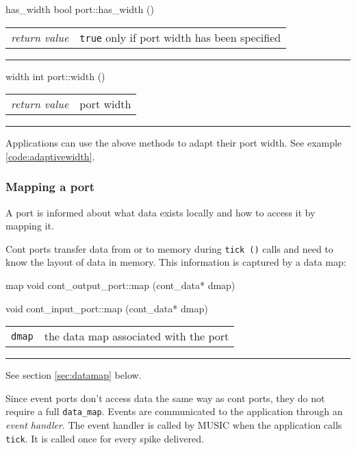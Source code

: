 \documentclass[a4paper]{report}
\makeatletter
\newenvironment{parameters}%
{\begin{tabular}{@{\hspace{2em}}lp{0.6\textwidth}}}%
{\end{tabular}\par\vspace{1mm}\par\hrule\par\vspace{5mm}}
\makeatother
\begin{document}
\begin{head}{has_width}
  bool port::has_width ()
\end{head}
\begin{parameters}
  \emph{return value} & \lstinline|true| only if port width has been
                         specified \\
\end{parameters}

\begin{head}{width}
  int port::width ()
\end{head}
\begin{parameters}
  \emph{return value} & port width \\
\end{parameters}

Applications can use the above methods to adapt their port width.  See
example \ref{code:adaptivewidth}.

\subsubsection{Mapping a port}

A port is informed about what data exists locally and how to access it
by mapping it.

Cont ports transfer data from or to memory during \lstinline|tick ()|
calls and need to know the layout of data in memory.  This information
is captured by a data map:

\begin{head}{map}
  void cont_output_port::map (cont_data* dmap)

  void cont_input_port::map (cont_data* dmap)
\end{head}
\begin{parameters}
  \lstinline|dmap| & the data map associated with the port \\
\end{parameters}

See section \ref{sec:datamap} below.

Since event ports don't access data the same way as cont ports, they
do not require a full \lstinline|data_map|.  Events are communicated
to the application through an \emph{event handler}.  The event handler is called by MUSIC when the application
calls \lstinline|tick|.  It is called once for every spike delivered.
\end{document}
